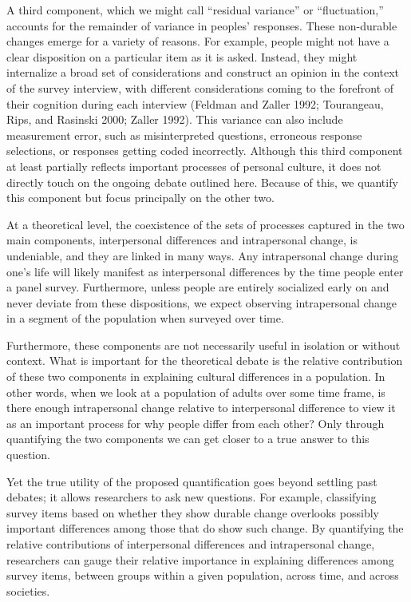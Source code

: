 \documentclass[
  12pt,
]{article}
\begin{document}
A third component, which we might call ``residual variance'' or
``fluctuation,'' accounts for the remainder of variance in peoples'
responses. These non-durable changes emerge for a variety of reasons.
For example, people might not have a clear disposition on a particular
item as it is asked. Instead, they might internalize a broad set of
considerations and construct an opinion in the context of the survey
interview, with different considerations coming to the forefront of
their cognition during each interview (Feldman and Zaller 1992;
Tourangeau, Rips, and Rasinski 2000; Zaller 1992). This variance can
also include measurement error, such as misinterpreted questions,
erroneous response selections, or responses getting coded incorrectly.
Although this third component at least partially reflects important
processes of personal culture, it does not directly touch on the ongoing
debate outlined here. Because of this, we quantify this component but
focus principally on the other two.

At a theoretical level, the coexistence of the sets of processes
captured in the two main components, interpersonal differences and
intrapersonal change, is undeniable, and they are linked in many ways.
Any intrapersonal change during one's life will likely manifest as
interpersonal differences by the time people enter a panel survey.
Furthermore, unless people are entirely socialized early on and never
deviate from these dispositions, we expect observing intrapersonal
change in a segment of the population when surveyed over time.

Furthermore, these components are not necessarily useful in isolation or
without context. What is important for the theoretical debate is the
relative contribution of these two components in explaining cultural
differences in a population. In other words, when we look at a
population of adults over some time frame, is there enough intrapersonal
change relative to interpersonal difference to view it as an important
process for why people differ from each other? Only through quantifying
the two components we can get closer to a true answer to this question.

Yet the true utility of the proposed quantification goes beyond settling
past debates; it allows researchers to ask new questions. For example,
classifying survey items based on whether they show durable change
overlooks possibly important differences among those that do show such
change. By quantifying the relative contributions of interpersonal
differences and intrapersonal change, researchers can gauge their
relative importance in explaining differences among survey items,
between groups within a given population, across time, and across
societies.
\end{document}
